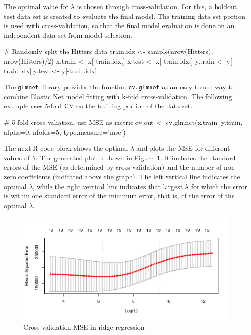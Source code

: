 The optimal value for $\lambda$ is chosen through cross-validation. For this, a holdout test data set is created to evaluate the final model. The training data set portion is used with cross-validation, so that the final model evaluation is done on an independent data set from model selection. 

\begin{samepage}
\begin{Rcode}
# Randomly split the Hitters data
train.idx <- sample(nrow(Hitters), nrow(Hitters)/2)
x.train <- x[ train.idx,]
x.test  <- x[-train.idx,]
y.train <- y[ train.idx]
y.test  <- y[-train.idx]
\end{Rcode}
\end{samepage}

\noindent The \texttt{glmnet} library provides the function \texttt{cv.glmnet} as an easy-to-use way to combine Elastic Net model fitting with k-fold cross-validation. The following example uses 5-fold CV on the training portion of the data set:

\begin{samepage}
\begin{Rcode}
# 5-fold cross-valiation, use MSE as metric
cv.out <- cv.glmnet(x.train, y.train, alpha=0, 
   nfolds=5, type.measure='mse')
\end{Rcode}
\end{samepage}

The next R code block shows the optimal $\lambda$ and plots the MSE for different values of $\lambda$. The generated plot is shown in Figure~\ref{fig:glmnetcv}. It includes the standard errors of the MSE (as determined by cross-validation) and the number of non-zero coefficients (indicated above the graph). The left vertical line indicates the optimal $\lambda$, while the right vertical line indicates that largest $\lambda$ for which the error is within one standard error of the minimum error, that is, of the error of the optimal $\lambda$.

\begin{samepage}
\end{samepage}

\begin{figure}
\centering

\includegraphics[width=.9\textwidth]{crossvalidated_ridge.pdf}
\caption{Cross-validation MSE in ridge regression}
\label{fig:glmnetcv}
\end{figure}

